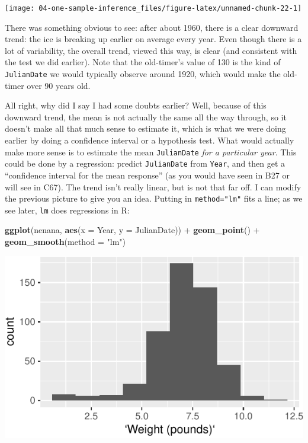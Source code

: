 \documentclass[]{tufte-book}
\newenvironment{Shaded}{}{}
\newcommand{\DataTypeTok}[1]{\textcolor[rgb]{0.56,0.13,0.00}{#1}}
\newcommand{\KeywordTok}[1]{\textcolor[rgb]{0.00,0.44,0.13}{\textbf{#1}}}
\newcommand{\NormalTok}[1]{#1}
\newcommand{\OperatorTok}[1]{\textcolor[rgb]{0.40,0.40,0.40}{#1}}
\newcommand{\StringTok}[1]{\textcolor[rgb]{0.25,0.44,0.63}{#1}}
\theoremstyle{definition}
\theoremstyle{definition}
\theoremstyle{definition}
\theoremstyle{remark}
\begin{document}
\texttt{[image: 04-one-sample-inference\_files/figure-latex/unnamed-chunk-22-1]}

There was something obvious to see: after about 1960, there is a clear
downward trend: the ice is breaking up earlier on average every year.
Even though there is a lot of variability, the overall trend, viewed
this way, is clear (and consistent with the test we did earlier). Note
that the old-timer's value of 130 is the kind of \texttt{JulianDate} we
would typically observe around 1920, which would make the old-timer over
90 years old.

All right, why did I say I had some doubts earlier? Well, because of
this downward trend, the mean is not actually the same all the way
through, so it doesn't make all that much sense to estimate it, which is
what we were doing earlier by doing a confidence interval or a
hypothesis test. What would actually make more sense is to estimate the
mean \texttt{JulianDate} \emph{for a particular year}. This could be
done by a regression: predict \texttt{JulianDate} from \texttt{Year},
and then get a ``confidence interval for the mean response'' (as you
would have seen in B27 or will see in C67). The trend isn't really
linear, but is not that far off. I can modify the previous picture to
give you an idea. Putting in \texttt{method="lm"} fits a line; as we see
later, \texttt{lm} does regressions in R:

\begin{Shaded}
\begin{Highlighting}[]
\KeywordTok{ggplot}\NormalTok{(nenana, }\KeywordTok{aes}\NormalTok{(}\DataTypeTok{x =}\NormalTok{ Year, }\DataTypeTok{y =}\NormalTok{ JulianDate)) }\OperatorTok{+}\StringTok{ }
\StringTok{    }\KeywordTok{geom_point}\NormalTok{() }\OperatorTok{+}\StringTok{ }\KeywordTok{geom_smooth}\NormalTok{(}\DataTypeTok{method =} \StringTok{"lm"}\NormalTok{)}
\end{Highlighting}
\end{Shaded}

\includegraphics{04-one-sample-inference_files/figure-latex/unnamed-chunk-23-1}
\end{document}

